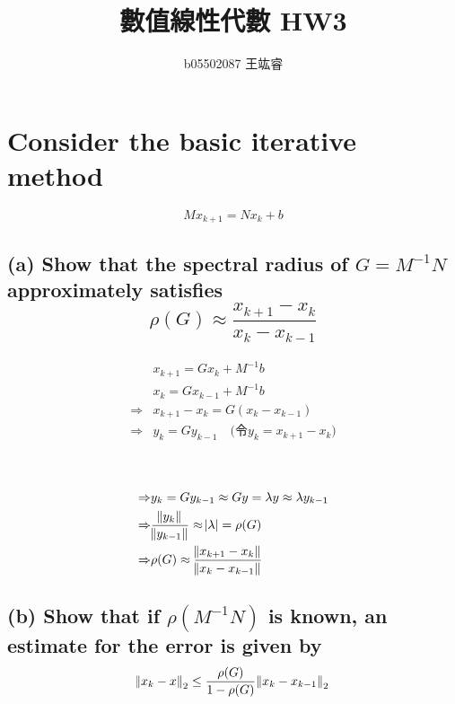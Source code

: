 \documentclass[12pt]{article}
\author{b05502087 王竑睿}
\date{}
\title{數值線性代數 HW3}
\begin{document}
\maketitle
\section{Consider the basic iterative method}
$$Mx_{k+1} = Nx_k + b$$
\subsection{(a) Show that the spectral radius of $G = M^{-1}N$ approximately satisfies $$\rho(G) \approx \dfrac{x_{k+1}-x_{k}}{x_{k}-x_{k-1}}$$}
    \[
        \begin{aligned}
            &x_{k+1}=Gx_k+M^{-1}b\\
            &x_{k}=Gx_{k-1}+M^{-1}b\\
        \Rightarrow &x_{k+1}-x_{k}=G(x_k-x_{k-1})\\
        \Rightarrow &y_{k}=Gy_{k-1} \quad \text{(令$y_k=x_{k+1}-x_{k}$)}\\
        \end{aligned}
    \]
    \\
    \\
    \[
        \begin{aligned}
        \Rightarrow &y_{k}=Gy_{k-1} \approx Gy = \lambda y \approx \lambda y_{k-1}\\
        \Rightarrow &\dfrac{\norm{y_{k}}}{\norm{y_{k-1}}} \approx \abs{\lambda} = \rho(G)\\
        \Rightarrow &\rho(G) \approx \dfrac{\norm{x_{k+1}-x_{k}}}{\norm{x_{k}-x_{k-1}}}\\
        \end{aligned}
    \]    
\subsection{(b) Show that if $\rho(M^{-1}N)$ is known, an estimate for the error is given by
                $$\norm{x_k - x}_2 \leq \dfrac{\rho(G)}{1-\rho(G)}\norm{x_k - x_{k-1}}_2$$
            }
\end{document}
